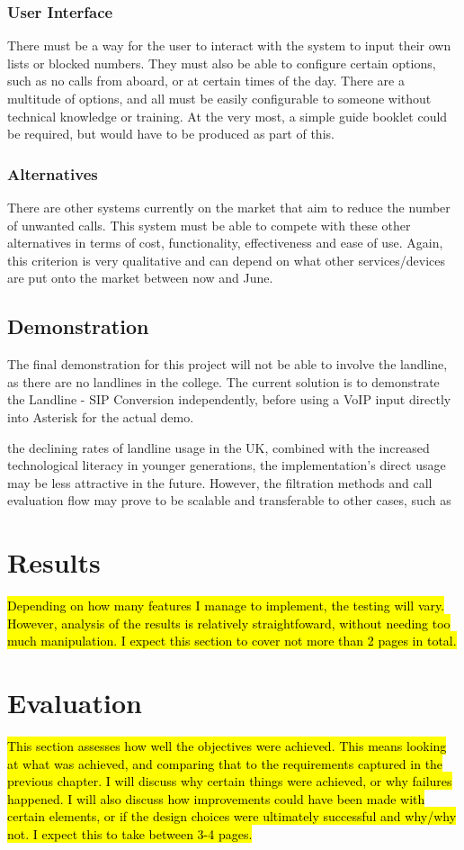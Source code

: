 \documentclass[12pt,a4paper]{report}
\begin{document}
\subsection{User Interface}
There must be a way for the user to interact with the system to input their own lists or blocked numbers. They must also be able to configure certain options, such as no calls from aboard, or at certain times of the day. There are a multitude of options, and all must be easily configurable to someone without technical knowledge or training. At the very most, a simple guide booklet could be required, but would have to be produced as part of this.
\subsection{Alternatives}
There are other systems currently on the market that aim to reduce the number of unwanted calls. This system must be able to compete with these other alternatives in terms of cost, functionality, effectiveness and ease of use. Again, this criterion is very qualitative and can depend on what other services/devices are put onto the market between now and June.
\section{Demonstration}
The final demonstration for this project will not be able to involve the landline, as there are no landlines in the college. The current solution is to demonstrate the Landline - SIP Conversion independently, before using a VoIP input directly into Asterisk for the actual demo.


the declining rates of landline usage in the UK, combined with the increased technological literacy in younger generations, the implementation’s direct usage may be less attractive in the future. However, the filtration methods and call evaluation flow may prove to be scalable and transferable to other cases, such as

\chapter{Results}
\hl{Depending on how many features I manage to implement, the testing will vary. However, analysis of the results is relatively straightfoward, without needing too much manipulation. I expect this section to cover not more than 2 pages in total. }

\chapter{Evaluation}
\hl{This section assesses how well the objectives were achieved. This means looking at what was achieved, and comparing that to the requirements captured in the previous chapter. I will discuss why certain things were achieved, or why failures happened. I will also discuss how improvements could have been made with certain elements, or if the design choices were ultimately successful and why/why not. I expect this to take between 3-4 pages.}
\end{document}
